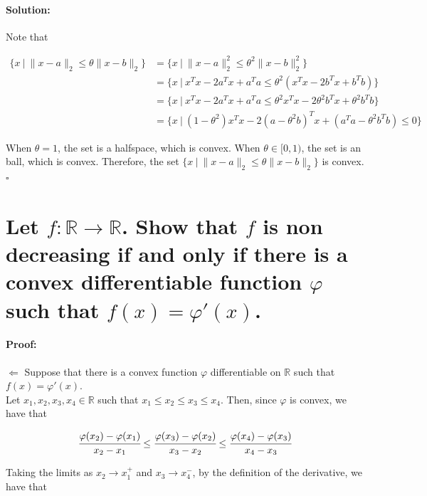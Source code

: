 \documentclass[10pt]{article}
\begin{document}
\paragraph{Solution:}

Note that 

\begin{align*}
  \{x \ | \ \| x - a \|_2 \leq \theta \| x - b \|_2\} &= \{x \ | \ \| x - a \|_2^2 \leq \theta^2 \| x - b \|_2^2\} \\
  &= \{x \ | \ x^Tx - 2a^Tx + a^Ta \leq \theta^2 (x^Tx - 2b^Tx + b^Tb)\} \\
  &= \{x \ | \ x^Tx - 2a^Tx + a^Ta \leq \theta^2 x^Tx - 2\theta^2 b^Tx + \theta^2 b^Tb\} \\
  &= \{x \ | \ (1 - \theta^2) x^Tx - 2(a - \theta^2 b)^Tx + (a^Ta - \theta^2 b^Tb) \leq 0\}
\end{align*}

When $\theta = 1$, the set is a halfspace, which is convex. When $\theta \in [0,1)$, the set is an ball, which is convex. Therefore, the set $\{x \ | \ \| x - a \|_2 \leq \theta \| x - b \|_2\}$ is convex. $\square$





\section{Let $f: \mathbb{R} \rightarrow \mathbb{R}$. Show that $f$ is non decreasing if and only if there is a 
convex differentiable function $\varphi$ such that $f(x) = \varphi'(x)$.}

\paragraph{Proof:}

$\Leftarrow$ Suppose that there is a convex function $\varphi$ differentiable on $\mathbb{R}$ such that $f(x) = \varphi'(x)$. \\

Let $x_1, x_2, x_3, x_4 \in \mathbb{R}$ such that $x_1 \leq x_2 \leq x_3 \leq x_4$. Then, since $\varphi$ is convex, we have that

$$ \cfrac{\varphi(x_2)-\varphi(x_1)}{x_2-x_1} \leq \cfrac{\varphi(x_3)-\varphi(x_2)}{x_3-x_2} \leq \cfrac{\varphi(x_4)-\varphi(x_3)}{x_4-x_3}$$

Taking the limits as $x_2 \rightarrow x_1^{+}$ and $x_3 \rightarrow x_4^{-}$, by the definition of the derivative, we have that
\end{document}
